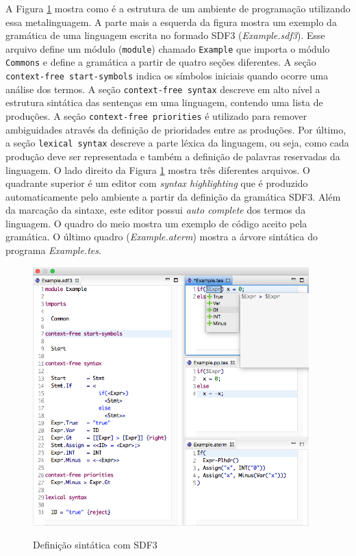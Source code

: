A Figura \ref{fig:sdf} mostra como é a estrutura de um ambiente de programação utilizando essa metalinguagem. A parte mais a esquerda da figura mostra um exemplo da gramática de uma linguagem escrita no formado SDF3 (\textit{Example.sdf3}). Esse arquivo define um módulo (\texttt{module}) chamado \texttt{Example} que importa o módulo \texttt{Commons} e define a gramática a partir de quatro seções diferentes. 
A seção \texttt{context-free start-symbols} indica os símbolos iniciais quando ocorre uma análise dos termos. A seção \texttt{context-free syntax} descreve em alto nível a estrutura sintática das sentenças em uma linguagem, contendo uma lista de produções. A seção \texttt{context-free priorities} é utilizado para remover ambiguidades através da definição de prioridades entre as produções. Por último, a seção \texttt{lexical syntax} descreve a parte léxica da linguagem, ou seja, como cada produção deve ser representada e também a definição de palavras reservadas da linguagem. O lado direito da Figura \ref{fig:sdf} mostra três diferentes arquivos. O quadrante superior é um editor com \textit{syntax highlighting} que é produzido automaticamente pelo ambiente a partir da definição da gramática SDF3. Além da marcação da sintaxe, este editor possui \textit{auto complete} dos termos da linguagem.
O quadro do meio mostra um exemplo de código aceito pela gramática. O último quadro (\textit{Example.aterm}) mostra a árvore sintática do programa \textit{Example.tes}.


\begin{figure}[h]
\centering
\caption{Definição sintática com SDF3}
\includegraphics[height=10cm]{figuras/sdf3-spoofax.png}
\label{fig:sdf}
\end{figure}

